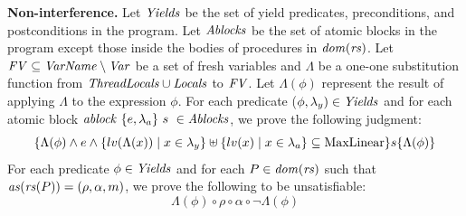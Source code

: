 {\bf Non-interference.}
Let $\mathit{Yields}$ be the set of yield predicates, preconditions, and postconditions in the program.
Let $\mathit{Ablocks}$ be the set of atomic blocks in the program except those inside the bodies of procedures
in $\mathit{dom}(\mathit{rs})$.
Let $\mathit{FV} \subseteq \mathit{VarName} \setminus \mathit{Var}$ be a set of fresh variables and $\Lambda$ be a one-one 
substitution function from $\mathit{ThreadLocals} \cup \mathit{Locals}$ to $\mathit{FV}$.
Let $\Lambda(\phi)$ represent the result of applying $\Lambda$ to the expression $\phi$.
For each predicate ($\phi,\lambda_y) \in \mathit{Yields}$
and for each atomic block $\mathit{ablock}\ {\{e,\lambda_a\}}\ {s}\  \in \mathit{Ablocks}$, we prove the following judgment:
\[
\{\Lambda(\phi) \wedge e \wedge
  \{lv(\Lambda(x)) \mid x \in \lambda_y\} \uplus
  \{lv(x) \mid x \in \lambda_a\} \subseteq \mathrm {MaxLinear}
\} s \{\Lambda(\phi)\}
\]
For each predicate $\phi \in \mathit{Yields}$ and for each $P \in \mathit{dom}(\mathit{rs})$ such that
$\mathit{as}(\mathit{rs}(P)) = (\rho, \alpha, m)$, we prove the following to be unsatisfiable:
\[
\Lambda(\phi) \circ \rho \circ \alpha \circ \neg\Lambda(\phi)
\]

